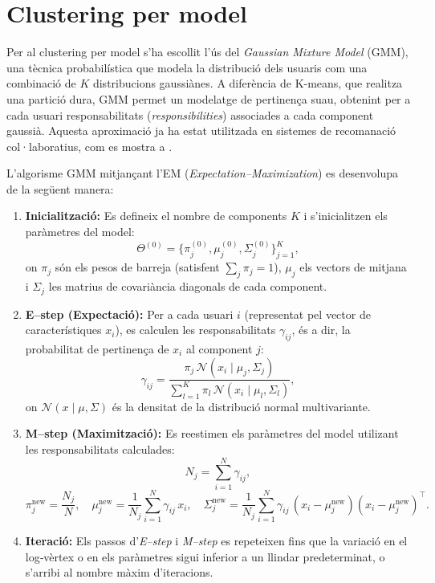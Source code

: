 \documentclass[a4paper,12pt]{report}
\begin{document}
\section{Clustering per model}

Per al clustering per model s’ha escollit l’ús del \emph{Gaussian Mixture Model} (GMM), una tècnica probabilística que modela la distribució dels usuaris com una combinació de $K$ distribucions gaussiànes. A diferència de K-means, que realitza una partició dura, GMM permet un modelatge de pertinença suau, obtenint per a cada usuari responsabilitats (\emph{responsibilities}) associades a cada component gaussià. Aquesta aproximació ja ha estat utilitzada en sistemes de recomanació col·laboratius, com es mostra a \cite{yan2019collaborative}.

L’algorisme GMM mitjançant l’EM (\emph{Expectation–Maximization}) es desenvolupa de la següent manera:

\begin{enumerate}
    \item \textbf{Inicialització:} Es defineix el nombre de components $K$ i s’inicialitzen els paràmetres del model:
    \[
    \Theta^{(0)} = \{\pi_j^{(0)}, \mu_j^{(0)}, \Sigma_j^{(0)}\}_{j=1}^K,
    \]
    on $\pi_j$ són els pesos de barreja (satisfent $\sum_j \pi_j = 1$), $\mu_j$ els vectors de mitjana i $\Sigma_j$ les matrius de covariància diagonals de cada component.

    \item \textbf{E–step (Expectació):} Per a cada usuari $i$ (representat pel vector de característiques $x_i$), es calculen les responsabilitats $\gamma_{ij}$, és a dir, la probabilitat de pertinença de $x_i$ al component $j$:
    \[
    \gamma_{ij} = \frac{\pi_j \,\mathcal{N}(x_i \mid \mu_j, \Sigma_j)}{\sum_{l=1}^K \pi_l \,\mathcal{N}(x_i \mid \mu_l, \Sigma_l)},
    \]
    on $\mathcal{N}(x \mid \mu, \Sigma)$ és la densitat de la distribució normal multivariante.

    \item \textbf{M–step (Maximització):} Es reestimen els paràmetres del model utilizant les responsabilitats calculades:
    \[
    N_j = \sum_{i=1}^N \gamma_{ij},
    \]
    \[
    \pi_j^{\text{new}} = \frac{N_j}{N}, \quad
    \mu_j^{\text{new}} = \frac{1}{N_j} \sum_{i=1}^N \gamma_{ij}\, x_i, \quad
    \Sigma_j^{\text{new}} = \frac{1}{N_j} \sum_{i=1}^N \gamma_{ij}\, (x_i - \mu_j^{\text{new}})(x_i - \mu_j^{\text{new}})^\top.
    \]

    \item \textbf{Iteració:} Els passos d’\emph{E–step} i \emph{M–step} es repeteixen fins que la variació en el log‑vèrtex o en els paràmetres sigui inferior a un llindar predeterminat, o s’arribi al nombre màxim d’iteracions.
\end{enumerate}
\end{document}
